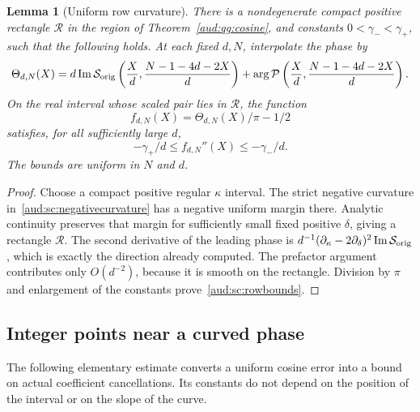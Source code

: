 \documentclass[11pt,a4paper]{article}
\numberwithin{equation}{section}
\newtheorem{lemma}[theorem]{Lemma}
\begin{document}
\begin{lemma}[Uniform row curvature]\label{aud:sc:rowcurvature}
There is a nondegenerate compact positive rectangle $\mathcal R$ in the region of Theorem~\ref{aud:qg:cosine}, and constants $0<\gamma_-<\gamma_+$, such that the following holds. At each fixed $d,N$, interpolate the phase by
\[
 \Theta_{d,N}(X)
 =d\operatorname{Im}\mathcal S_{\rm orig}\left(\frac Xd,\frac{N-1-4d-2X}{d}\right)
 +\arg\mathcal P\left(\frac Xd,\frac{N-1-4d-2X}{d}\right).
\]
On the real interval whose scaled pair lies in $\mathcal R$, the function
\[
 f_{d,N}(X)=\Theta_{d,N}(X)/\pi-1/2
\]
satisfies, for all sufficiently large $d$,
\begin{equation}\label{aud:sc:rowbounds}
 -\gamma_+/d\le f_{d,N}''(X)\le-\gamma_-/d.
\end{equation}
The bounds are uniform in $N$ and $d$.
\end{lemma}
\begin{proof}
Choose a compact positive regular $\kappa$ interval. The strict negative curvature in~\eqref{aud:sc:negativecurvature} has a negative uniform margin there. Analytic continuity preserves that margin for sufficiently small fixed positive $\delta$, giving a rectangle $\mathcal R$. The second derivative of the leading phase is $d^{-1}(\partial_\kappa-2\partial_\delta)^2\operatorname{Im}\mathcal S_{\rm orig}$, which is exactly the direction already computed. The prefactor argument contributes only $O(d^{-2})$, because it is smooth on the rectangle. Division by $\pi$ and enlargement of the constants prove~\eqref{aud:sc:rowbounds}.
\end{proof}
\subsection{Integer points near a curved phase}\label{aud:sc:geometry}
The following elementary estimate converts a uniform cosine error into a
bound on actual coefficient cancellations.  Its constants do not depend on
the position of the interval or on the slope of the curve.
\end{document}
